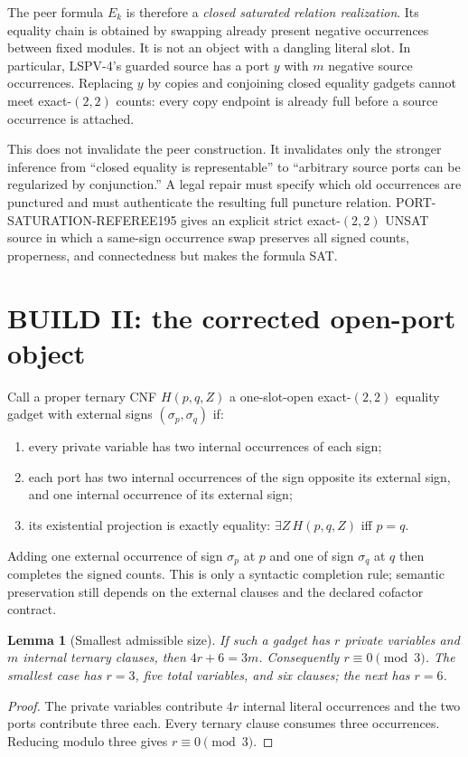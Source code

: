 \documentclass[11pt]{article}
\newtheorem{lemma}[theorem]{Lemma}
\begin{document}
The peer formula $E_k$ is therefore a \emph{closed saturated relation
realization}. Its equality chain is obtained by swapping already present
negative occurrences between fixed modules. It is not an object with a
dangling literal slot. In particular, LSPV-4's guarded source has a port $y$
with $m$ negative source occurrences. Replacing $y$ by copies and conjoining
closed equality gadgets cannot meet exact-$(2,2)$ counts: every copy endpoint
is already full before a source occurrence is attached.

This does not invalidate the peer construction. It invalidates only the
stronger inference from ``closed equality is representable'' to ``arbitrary
source ports can be regularized by conjunction.'' A legal repair must specify
which old occurrences are punctured and must authenticate the resulting full
puncture relation. PORT-SATURATION-REFEREE195 gives an explicit strict
exact-$(2,2)$ UNSAT source in which a same-sign occurrence swap preserves all
signed counts, properness, and connectedness but makes the formula SAT.

\section{BUILD II: the corrected open-port object}
Call a proper ternary CNF $H(p,q,Z)$ a one-slot-open exact-$(2,2)$ equality
gadget with external signs $(\sigma_p,\sigma_q)$ if:
\begin{enumerate}
\item every private variable has two internal occurrences of each sign;
\item each port has two internal occurrences of the sign opposite its
external sign, and one internal occurrence of its external sign;
\item its existential projection is exactly equality:
$\exists Z\,H(p,q,Z)$ iff $p=q$.
\end{enumerate}
Adding one external occurrence of sign $\sigma_p$ at $p$ and one of sign
$\sigma_q$ at $q$ then completes the signed counts. This is only a syntactic
completion rule; semantic preservation still depends on the external clauses
and the declared cofactor contract.

\begin{lemma}[Smallest admissible size]\label{lem:size}
If such a gadget has $r$ private variables and $m$ internal ternary clauses,
then $4r+6=3m$. Consequently $r\equiv0\pmod3$. The smallest case has
$r=3$, five total variables, and six clauses; the next has $r=6$.
\end{lemma}
\begin{proof}
The private variables contribute $4r$ internal literal occurrences and the
two ports contribute three each. Every ternary clause consumes three
occurrences. Reducing modulo three gives $r\equiv0\pmod3$.
\end{proof}
\end{document}
